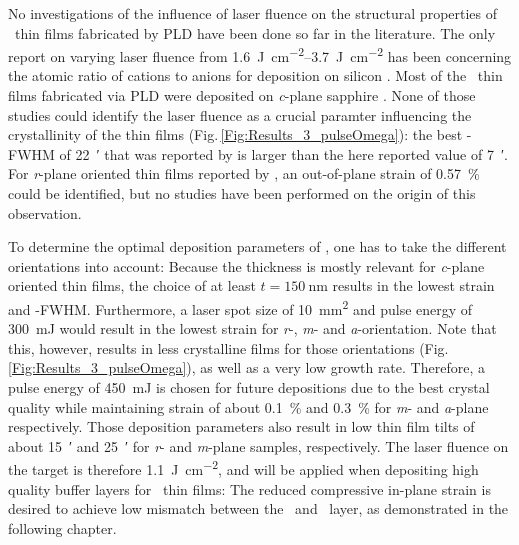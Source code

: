 No investigations of the influence of laser fluence on the structural properties of \cro\ thin films fabricated by PLD have been done so far in the literature.
The only report on varying laser fluence from \qtyrange{1.6}{3.7}{\J\per\cm\squared} has been concerning the atomic ratio of  cations to  anions for deposition on silicon
    \cite{tabbal2006}.
Most of the \cro\ thin films fabricated via PLD were deposited on \textit{c}-plane sapphire
    \cite{singh2019,arca2017,kehoe2016}.
None of those studies could identify the laser fluence as a crucial paramter influencing the crystallinity of the thin films (Fig.\,\ref{Fig:Results_3_pulseOmega}):
the best \textomega-FWHM of \qty{22}{\arcminute} that was reported by \textcite{singh2019} is larger than the here reported value of \qty{7}{\arcminute}.
For \textit{r}-plane oriented thin films reported by \textcite{punugupati2015}, an out-of-plane strain of \qty{0.57}{\percent} could be identified, but no studies have been performed on the origin of this observation.

To determine the optimal deposition parameters of \cro, one has to take the different orientations into account:
Because the thickness is mostly relevant for \textit{c}-plane oriented thin films, the choice of at least $t=\qty{150}{\nm}$ results in the lowest strain and \textomega-FWHM.
Furthermore, a laser spot size of \qty{10}{\mm\squared} and pulse energy of \qty{300}{\milli\J} would result in the lowest strain for \textit{r}-, \textit{m}- and \textit{a}-orientation.
Note that this, however, results in less crystalline films for those orientations (Fig.\,\ref{Fig:Results_3_pulseOmega}), as well as a very low growth rate.
Therefore, a pulse energy of \qty{450}{\milli\J} is chosen for future depositions due to the best crystal quality while maintaining strain of about \qty{0.1}{\percent} and \qty{0.3}{\percent} for \textit{m}- and \textit{a}-plane respectively.
Those deposition parameters also result in low thin film tilts of about \qty{15}{\arcminute} and \qty{25}{\arcminute} for \textit{r}- and \textit{m}-plane samples, respectively.
The laser fluence on the target is therefore \qty{1.1}{\J\per\cm\squared}, and will be applied when depositing high quality buffer layers for \agao\ thin films:
The reduced compressive in-plane strain is desired to achieve low mismatch between the \cro\ and \agao\ layer, as demonstrated in the following chapter.


